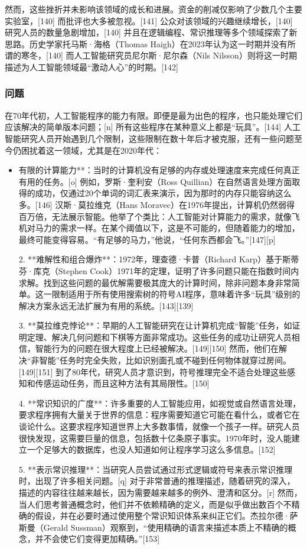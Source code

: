 然而，这些挫折并未影响该领域的成长和进展。资金的削减仅影响了少数几个主要实验室，[140] 而批评也大多被忽视。[141] 公众对该领域的兴趣继续增长，[140] 研究人员的数量急剧增加，[140] 并且在逻辑编程、常识推理等多个领域探索了新思路。历史学家托马斯·海格（Thomas Haigh）在2023年认为这一时期并没有所谓的寒冬，[140] 而人工智能研究员尼尔斯·尼尔森（Nils Nilsson）则将这一时期描述为人工智能领域最“激动人心”的时期。[142]
\subsubsection{问题}
在70年代初，人工智能程序的能力有限。即便是最为出色的程序，也只能处理它们应该解决的简单版本问题；[n] 所有这些程序在某种意义上都是“玩具”。[144] 人工智能研究人员开始遇到几个限制，这些限制在数十年后才被克服，还有一些问题至今仍困扰着这一领域，尤其是在2020年代：

\begin{itemize}
\item 有限的计算能力**：当时的计算机没有足够的内存或处理速度来完成任何真正有用的任务。[o] 例如，罗斯·奎利安（Ross Quillian）在自然语言处理方面取得的成功，仅通过20个单词的词汇表来演示，因为那时的内存只能容纳这么多。[146] 汉斯·莫拉维克（Hans Moravec）在1976年提出，计算机仍然弱得百万倍，无法展示智能。他举了个类比：人工智能对计算能力的需求，就像飞机对马力的需求一样。在某个阈值以下，这是不可能的，但随着能力的增加，最终可能变得容易。“有足够的马力，”他说，“任何东西都会飞。”[147][p]

2. **难解性和组合爆炸**：1972年，理查德·卡普（Richard Karp）基于斯蒂芬·库克（Stephen Cook）1971年的定理，证明了许多问题只能在指数时间内求解。找到这些问题的最优解需要极其庞大的计算时间，除非问题本身非常简单。这一限制适用于所有使用搜索树的符号AI程序，意味着许多“玩具”级别的解决方案永远无法扩展为有用的系统。[143][139]

3. **莫拉维克悖论**：早期的人工智能研究在让计算机完成“智能”任务，如证明定理、解决几何问题和下棋等方面非常成功。这些任务的成功让研究人员相信，智能行为的问题在很大程度上已经被解决。[149][150] 然而，他们在解决“非智能”任务时完全失败，比如识别面孔或不碰到任何物体就穿过房间。[149][151] 到了80年代，研究人员才意识到，符号推理完全不适合处理这些感知和传感运动任务，而且这种方法有其局限性。[150]

4. **常识知识的广度**：许多重要的人工智能应用，如视觉或自然语言处理，要求程序拥有大量关于世界的信息：程序需要知道它可能在看什么，或者它在谈论什么。这要求程序知道世界上大多数事情，就像一个孩子一样。研究人员很快发现，这需要巨量的信息，包括数十亿条原子事实。1970年时，没人能建立一个足够大的数据库，也没人知道如何让程序学习这么多信息。[152]

5. **表示常识推理**：当研究人员尝试通过形式逻辑或符号来表示常识推理时，出现了许多相关问题。[q] 对于非常普通的推理描述，随着研究的深入，描述的内容往往越来越长，因为需要越来越多的例外、澄清和区分。[r] 然而，当人们思考普通概念时，他们并不依赖精确的定义，而是似乎做出数百个不精确的假设，并在必要时通过使用整个常识知识体系来纠正它们。杰拉尔德·萨斯曼（Gerald Sussman）观察到，“使用精确的语言来描述本质上不精确的概念，并不会使它们变得更加精确。”[153]
\end{itemize}